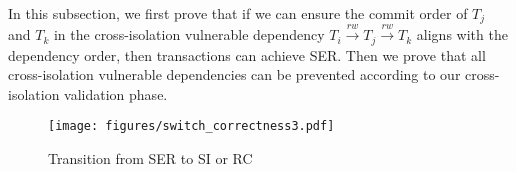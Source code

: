In this subsection, we first prove that if we can ensure the commit order of $T_j$ and $T_k$ in the cross-isolation vulnerable dependency $T_i \xrightarrow{rw} T_j \xrightarrow{rw} T_k$ aligns with the dependency order, then transactions can achieve SER. Then we prove that all cross-isolation vulnerable dependencies can be prevented according to our cross-isolation validation phase.



\begin{figure}[t]
    \centering
    \texttt{[image: figures/switch\_correctness3.pdf]}
    \vspace{-4mm}
    \caption{Transition from SER to SI or RC}
    \label{fig:switch_correctness}
    \vspace{-4mm}
\end{figure}

